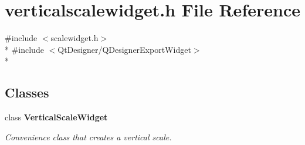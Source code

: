 \section{verticalscalewidget.\+h File Reference}
\label{bk3_2verticalscalewidget_8h}
{\ttfamily \#include $<$scalewidget.\+h$>$}\\*
{\ttfamily \#include $<$Qt\+Designer/\+Q\+Designer\+Export\+Widget$>$}\\*
\subsection*{Classes}
\begin{DoxyCompactItemize}
\item 
class {\bf Vertical\+Scale\+Widget}
\begin{DoxyCompactList}\small\item\em Convenience class that creates a vertical scale. \end{DoxyCompactList}\end{DoxyCompactItemize}
